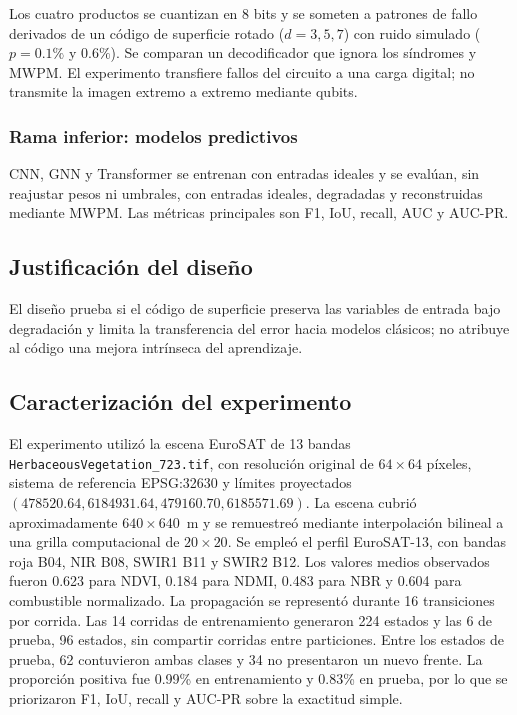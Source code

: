 \documentclass[fleqn,10pt]{wlscirep}
\begin{document}
Los cuatro productos se cuantizan en 8 bits y se someten a patrones de fallo derivados de un código de superficie rotado ($d=3,5,7$) con ruido simulado ($p=0.1\%$ y $0.6\%$). Se comparan un decodificador que ignora los síndromes y MWPM. El experimento transfiere fallos del circuito a una carga digital; no transmite la imagen extremo a extremo mediante qubits.

\subsubsection*{Rama inferior: modelos predictivos}

CNN, GNN y Transformer se entrenan con entradas ideales y se evalúan, sin reajustar pesos ni umbrales, con entradas ideales, degradadas y reconstruidas mediante MWPM. Las métricas principales son F1, IoU, recall, AUC y AUC-PR.


\subsection*{Justificación del diseño}

El diseño prueba si el código de superficie preserva las variables de entrada bajo degradación y limita la transferencia del error hacia modelos clásicos; no atribuye al código una mejora intrínseca del aprendizaje.


\subsection*{Caracterización del experimento}

El experimento utilizó la escena EuroSAT de 13 bandas \texttt{HerbaceousVegetation\_723.tif}, con resolución original de $64\times64$ píxeles, sistema de referencia EPSG:32630 y límites proyectados $(478520.64,6184931.64,479160.70,6185571.69)$. La escena cubrió aproximadamente $640\times640$~m y se remuestreó mediante interpolación bilineal a una grilla computacional de $20\times20$. Se empleó el perfil EuroSAT-13, con bandas roja B04, NIR B08, SWIR1 B11 y SWIR2 B12. Los valores medios observados fueron 0.623 para NDVI, 0.184 para NDMI, 0.483 para NBR y 0.604 para combustible normalizado. La propagación se representó durante 16 transiciones por corrida. Las 14 corridas de entrenamiento generaron 224 estados y las 6 de prueba, 96 estados, sin compartir corridas entre particiones. Entre los estados de prueba, 62 contuvieron ambas clases y 34 no presentaron un nuevo frente. La proporción positiva fue 0.99\% en entrenamiento y 0.83\% en prueba, por lo que se priorizaron F1, IoU, recall y AUC-PR sobre la exactitud simple.
\end{document}
